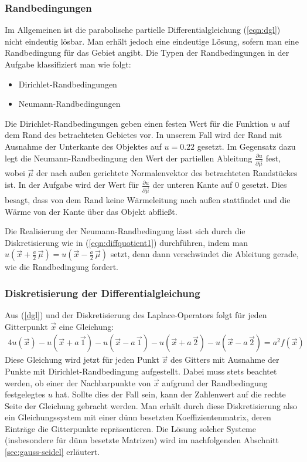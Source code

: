 \documentclass[10pt,a4paper]{article}
\begin{document}
\subsubsection{Randbedingungen}
\label{randbedingungen}
Im Allgemeinen ist die parabolische partielle Differentialgleichung (\ref{eqn:dgl}) nicht eindeutig lösbar. Man erhält jedoch eine eindeutige Lösung, sofern man eine Randbedingung für das Gebiet angibt. Die Typen der Randbedingungen in der Aufgabe klassifiziert man wie folgt:
\begin{itemize}
\item Dirichlet-Randbedingungen
\item Neumann-Randbedingungen
\end{itemize}
Die Dirichlet-Randbedingungen geben einen festen Wert für die Funktion $u$ auf dem Rand des betrachteten Gebietes vor. In unserem Fall wird der Rand mit Ausnahme der Unterkante des Objektes auf $u = \num{0.22}$ gesetzt. 
Im Gegensatz dazu legt die Neumann-Randbedingung den Wert der partiellen Ableitung $\frac{\partial u}{\partial \vec{\mu}}$ fest, wobei $\vec{\mu}$ der nach außen gerichtete Normalenvektor des betrachteten Randstückes ist. In der Aufgabe wird der Wert für $\frac{\partial u}{\partial \vec{\mu}}$ der unteren Kante auf $\num{0}$ gesetzt. Dies besagt, dass von dem Rand keine Wärmeleitung nach außen stattfindet und die Wärme von der Kante über das Objekt abfließt.

Die Realisierung der Neumann-Randbedingung lässt sich durch die Diskretisierung wie in (\ref{eqn:diffquotient1}) durchführen, indem man $u(\vec{x}+\frac{a}{2}\,\vec{\mu})=u(\vec{x}-\frac{a}{2}\,\vec{\mu})$ setzt, denn dann verschwindet die Ableitung gerade, wie die Randbedingung fordert.


\subsubsection{Diskretisierung der Differentialgleichung}
Aus (\ref{dgl}) und der Diskretisierung des Laplace-Operators folgt für jeden Gitterpunkt $\vec{x}$ eine Gleichung:
\begin{align}
4 u(\vec{x}) - u(\vec{x}+a\,\vec{1}) - u(\vec{x}-a\,\vec{1}) - u(\vec{x}+a\,\vec{2}) - u(\vec{x}-a\,\vec{2}) = a^2 f(\vec{x})
\label{eqn:dgldiskret}
\end{align}
Diese Gleichung wird jetzt für jeden Punkt $\vec{x}$ des Gitters mit Ausnahme der Punkte mit Dirichlet-Randbedingung aufgestellt. Dabei muss stets beachtet werden, ob einer der Nachbarpunkte von $\vec{x}$ aufgrund der Randbedingung festgelegtes $u$ hat. Sollte dies der Fall sein, kann der Zahlenwert auf die rechte Seite der Gleichung gebracht werden.
Man erhält durch diese Diskretisierung also ein Gleichungssystem mit einer dünn besetzten Koeffizientenmatrix, deren Einträge die Gitterpunkte repräsentieren. Die Lösung solcher Systeme (insbesondere für dünn besetzte Matrizen) wird im nachfolgenden Abschnitt \ref{sec:gauss-seidel} erläutert.
\end{document}
